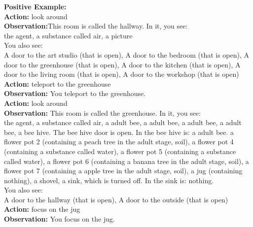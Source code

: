 \begin{tcolorbox}[breakable,title=Training Data Example for ScienceWorld]
\textcolor{my_green!50}{\textbf{Positive Example:} }\\
\textcolor{my_purple}{\textbf{Action:} look around}\\
\textcolor{my_blue!50}{\textbf{Observation:}This room is called the hallway. In it, you see:\\
        the agent, a substance called air, a picture\\
You also see:\\
        A door to the art studio (that is open), A door to the bedroom (that is open), A door to the greenhouse (that is open), A door to the kitchen (that is open), A door to the living room (that is open), A door to the workshop (that is open)}\\
\textcolor{my_purple}{\textbf{Action:} teleport to the greenhouse}\\
\textcolor{my_blue!50}{\textbf{Observation:} You teleport to the greenhouse. }\\
\textcolor{my_purple}{\textbf{Action:} look around}\\
\textcolor{my_blue!50}{\textbf{Observation:} This room is called the greenhouse. In it, you see:\\
        the agent, a substance called air, a adult bee, a adult bee, a adult bee, a adult bee, a bee hive. The bee hive door is open. In the bee hive is: a adult bee. a flower pot 2 (containing a peach tree in the adult stage, soil), a flower pot 4 (containing a substance called water), a flower pot 5 (containing a substance called water), a flower pot 6 (containing a banana tree in the adult stage, soil), a flower pot 7 (containing a apple tree in the adult stage, soil), a jug (containing nothing), a shovel, a sink, which is turned off. In the sink is: nothing.\\
You also see:\\
        A door to the hallway (that is open), A door to the outside (that is open) }\\
\textcolor{my_purple}{\textbf{Action:} focus on the jug}\\
\textcolor{my_blue!50}{\textbf{Observation:} You focus on the jug. }\\


\end{tcolorbox}
